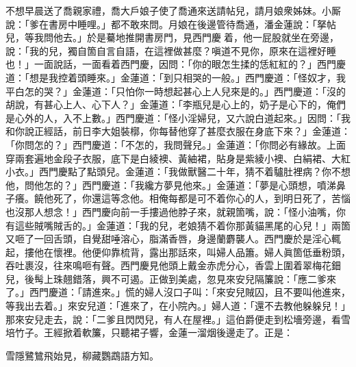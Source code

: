 不想早晨送了喬親家禮，喬大戶娘子使了喬通來送請帖兒，請月娘衆姊妹。小厮說：「爹在書房中睡哩。」都不敢來問。月娘在後邊管待喬通，潘金蓮說：「拏帖兒，等我問他去。」於是驀地推開書房門，見西門慶𢱉着，他一屁股就坐在旁邊，說：「我的兒，獨自箇自言自語，在這裡做甚麼？嗔道不見你，原來在這裡好睡也！」一面說話，一面看着西門慶，因問：「你的眼怎生揉的恁紅紅的？」{}西門慶道：「想是我控着頭睡來。」金蓮道：「到只相哭的一般。」{}西門慶道：「怪奴才，我平白怎的哭？」金蓮道：「只怕你一時想起甚心上人兒來是的。」{}西門慶道：「沒的胡說，有甚心上人、心下人？」金蓮道：「李瓶兒是心上的，奶子是心下的，俺們是心外的人，入不上數。」西門慶道：「怪小淫婦兒，又六說白道起來。」因問：「我和你說正經話，前日李大姐裝槨，你每替他穿了甚麼衣服在身底下來？」金蓮道：「你問怎的？」西門慶道：「不怎的，我問聲兒。」金蓮道：「你問必有緣故。上面穿兩套遍地金段子衣服，底下是白綾襖、黃紬裙，貼身是紫綾小襖、白絹裙、大紅小衣。」西門慶點了點頭兒。金蓮道：「我做獸醫二十年，猜不着驢肚裡病？你不想他，問他怎的？」西門慶道：「我纔方夢見他來。」{}金蓮道：「夢是心頭想，噴涕鼻子癢。{}饒他死了，你還這等念他。相俺每都是可不着你心的人，到明日死了，苦惱也沒那人想念！」西門慶向前一手摟過他脖子來，就親箇嘴，說：「怪小油嘴，你有這些賊嘴賊舌的。」金蓮道：「我的兒，老娘猜不着你那黃貓黑尾的心兒！」兩箇又咂了一回舌頭，自覺甜唾溶心，脂滿香唇，身邊蘭麝襲人。西門慶於是淫心輒起，摟他在懷裡。他便仰靠梳背，露出那話來，叫婦人品簫。婦人眞箇低垂粉頭，吞吐裹沒，往來鳴咂有聲。西門慶見他頭上戴金赤虎分心，香雲上圍着翠梅花鈿兒，後髩上珠翹錯落，興不可遏。{}正做到美處，忽見來安兒隔簾說：「應二爹來了。」西門慶道：「請進來。」慌的婦人沒口子叫：「來安兒賊囚，且不要叫他進來，等我出去着。」來安兒道：「進來了，在小院內。」婦人道：「還不去教他躲躲兒！」那來安兒走去，說：「二爹且閃閃兒，有人在屋裡。」這伯爵便走到松墻旁邊，看雪培竹子。王經掀着軟簾，只聽裙子響，金蓮一溜烟後邊走了。正是：

\begin{myquote} 
雪隱鷺鷥飛始見，柳藏鸚鵡語方知。
\end{myquote} 

